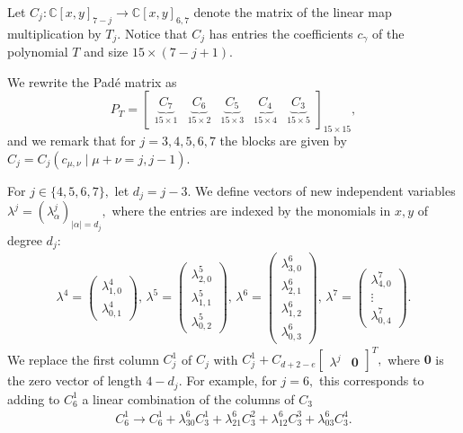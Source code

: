 \documentclass[letterpaper,11pt]{amsart}
\theoremstyle{plain}
\theoremstyle{definition}
\begin{document}
Let $C_j: \mathbb{C}[x,y]_{7-j} \to \mathbb{C}[x,y]_{6,7}$ denote the matrix of the linear map multiplication by $T_j.$ Notice that $C_j$ has entries the coefficients $c_{\gamma}$ of the polynomial $T$ and size $15\times (7-j+1).$  

We rewrite the Pad\'e matrix as $$P_T=\begin{bmatrix}
\underbrace{C_7}_{15\times 1} & \underbrace{C_6}_{15\times 2} & \underbrace{C_5}_{15\times 3} & \underbrace{C_4}_{15\times 4} & \underbrace{C_3}_{15\times 5} 
\end{bmatrix}_{15 \times 15},$$
and we remark that for $j=3,4,5,6,7$ the blocks are given by $C_j=C_j(c_{\mu,\nu} \mid \mu+\nu=j,j-1)$.

For $j \in \{4,5,6,7\},$ let $d_j=j-3.$ We define vectors of new independent variables $\lambda^j=(\lambda_{\alpha}^j)_{|\alpha|=d_j},$ where the entries are indexed by the monomials in $x,y$ of degree $d_j$:
\begin{align*}
 \lambda^4=\begin{pmatrix}
        \lambda^4_{1,0}\\ \lambda^4_{0,1}
    \end{pmatrix}, \,     \lambda^5=\begin{pmatrix}
        \lambda^5_{2,0}\\ \lambda^5_{1,1}\\ \lambda^5_{0,2}
    \end{pmatrix}, \,  \lambda^6=\begin{pmatrix}
        \lambda^6_{3,0}\\ \lambda^6_{2,1}\\ \lambda^6_{1,2}\\ \lambda^6_{0,3}
    \end{pmatrix}, \,  \lambda^7=\begin{pmatrix}
        \lambda^7_{4,0}\\ \vdots \\ \lambda^7_{0,4}
    \end{pmatrix}. 
\end{align*}
We replace the first column $C_j^1$ of $C_j$ with $C_j^1+C_{d+2-e}\begin{bmatrix}
\lambda^j & \mathbf{0}    
\end{bmatrix}^T,$ where $\mathbf{0}$ is the zero vector of length $4-d_j.$ For example, for $j=6,$ this corresponds to adding to $C_6^1$ a linear combination of the columns of $C_3$ 
\begin{align*}
C_6^1 \rightarrow C_6^1+\lambda_{30}^6 C_3^1+\lambda_{21}^6 C_3^2 + \lambda_{12}^6 C_3^3 + \lambda_{03}^6 C_3^4.    
\end{align*}
\end{document}
